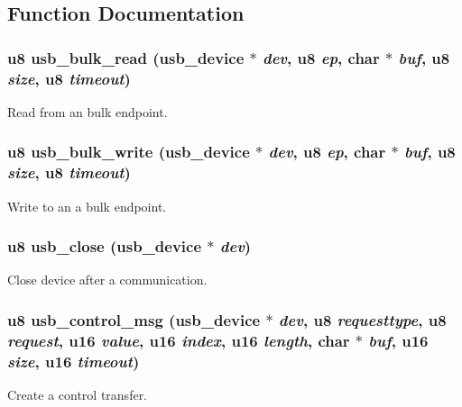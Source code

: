 \subsection{Function Documentation}
\subsubsection{\setlength{\rightskip}{0pt plus 5cm}u8 usb\_\-bulk\_\-read ({\bf usb\_\-device} $\ast$ {\em dev}, u8 {\em ep}, char $\ast$ {\em buf}, u8 {\em size}, u8 {\em timeout})}\label{usb_8c_09618efcb98dc1cf22908bc76973ac5b}


Read from an bulk endpoint. 
\subsubsection{\setlength{\rightskip}{0pt plus 5cm}u8 usb\_\-bulk\_\-write ({\bf usb\_\-device} $\ast$ {\em dev}, u8 {\em ep}, char $\ast$ {\em buf}, u8 {\em size}, u8 {\em timeout})}\label{usb_8c_780bd3c2aeb11aa07d94e7fd2814091e}


Write to an a bulk endpoint. 
\subsubsection{\setlength{\rightskip}{0pt plus 5cm}u8 usb\_\-close ({\bf usb\_\-device} $\ast$ {\em dev})}\label{usb_8c_a016743f793d7fbe430b91a6ac19bbca}


Close device after a communication. 
\subsubsection{\setlength{\rightskip}{0pt plus 5cm}u8 usb\_\-control\_\-msg ({\bf usb\_\-device} $\ast$ {\em dev}, u8 {\em requesttype}, u8 {\em request}, u16 {\em value}, u16 {\em index}, u16 {\em length}, char $\ast$ {\em buf}, u16 {\em size}, u16 {\em timeout})}\label{usb_8c_1819f0ea1b21096f25d9f7f6747aae41}


Create a control transfer. 
